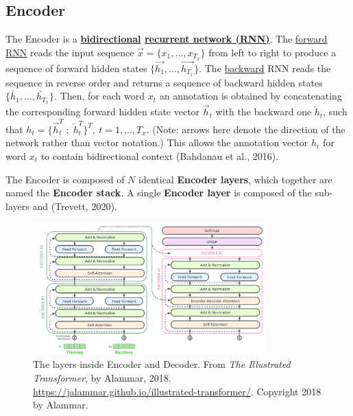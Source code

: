 \subsection{Encoder} \label{sec:TransformerEncoder}

The Encoder is a \textbf{\hyperref[sec:BidirectionalLM]{bidirectional} \hyperref[sec:RNN]{recurrent network (RNN)}}. The \hyperref[sec:ForwardLM]{forward} \hyperref[sec:RNN]{RNN} reads the input sequence $\overrightarrow{x} = \Big\{ x_1,...,x_{T_x} \Big\}$ from left to right to produce a sequence of forward hidden states $\Big\{ \overrightarrow{h_1},..., \overrightarrow{h_{T_x}} \Big\}$. The \hyperref[sec:BackwardLM]{backward} RNN reads the sequence in reverse order and returns a sequence of backward hidden states $\Big\{ \overleftarrow{h_1},..., \overleftarrow{h_{T_x}} \Big\}$. Then, for each word $x_t$ an annotation is obtained by concatenating the corresponding forward hidden state vector $\overrightarrow{h}_t$ with the backward one $\overleftarrow{h}_t$, such that $h_t = \Big \{ \overrightarrow{h}_t^T \; ; \; \overleftarrow{h}_t^T \Big\}^T , \: t=1,...,T_x$. (Note: arrows here denote the direction of the network rather than vector notation.) This allows the annotation vector $h_t$ for word $x_t$ to contain bidirectional context (Bahdanau et al., 2016). 

The Encoder is composed of $N$ identical \textbf{Encoder layers}, which together are named the \textbf{Encoder stack}. A single \textbf{Encoder layer} is composed of the sub-layers \textbf{} and \textbf{ } (Trevett, 2020). 





\begin{figure}[h]
\vspace{-5pt}
\centering
\includegraphics[width=0.8\textwidth]{imgs/encoderDecoderLayersDetailed.png}
\vspace{-5pt}
\caption{ The layers inside Encoder and Decoder. From \emph{The Illustrated Transformer}, by Alammar, 2018. \url{https://jalammar.github.io/illustrated-transformer/}. Copyright 2018 by Alammar.}
\vspace{-5pt}
\label{fig:encDecLayersDetailed}
\end{figure}




